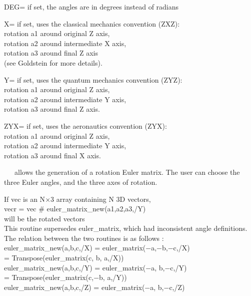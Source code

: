 \begin{keywords}
  \begin{kwlist}{} %
    \item[DEG=] if set, the angles are in degrees instead of radians
    \item[X=] if set, uses the classical mechanics convention (ZXZ):\\
	rotation a1 around original Z axis, \\
	rotation a2 around intermediate X axis, \\
        rotation a3 around final Z axis \\
        (see Goldstein for more details). \\

    \item[Y=] if set, uses the quantum mechanics convention (ZYZ):\\
	rotation a1 around original Z axis, \\
	rotation a2 around intermediate Y axis, \\
        rotation a3 around final Z axis.

    \item[ZYX=] if set, uses the aeronautics convention (ZYX):\\
	rotation a1 around original Z axis, \\
	rotation a2 around intermediate Y axis, \\
        rotation a3 around final X axis.
  \end{kwlist}
\end{keywords}  

\begin{codedescription}
{\parbox[t]{\hsize}{\facname\ ~\ allows the generation of a rotation Euler matrix. The user
can choose the three Euler angles, and the three axes of rotation.

If vec is an N$\times$3 array containing N 3D vectors, \\
    vecr = vec  \# euler\_matrix\_new(a1,a2,a3,/Y) \\
will be the rotated vectors\\
 
This routine supersedes euler\_matrix, which had inconsistent angle
definitions. The relation between the two routines is as follows  :
\\[.2cm]
%
euler\_matrix\_new(a,b,c,/X)  =  euler\_matrix($-$a,$-$b,$-$c,/X) \\
= Transpose(euler\_matrix(c, b, a,/X)) \\[.2cm]
%
euler\_matrix\_new(a,b,c,/Y)  =  euler\_matrix($-$a, b,$-$c,/Y) \\
= Transpose(euler\_matrix(c,$-$b, a,/Y)) \\[.2cm]
%
euler\_matrix\_new(a,b,c,/Z)  =  euler\_matrix($-$a, b,$-$c,/Z)
}}
\end{codedescription}


